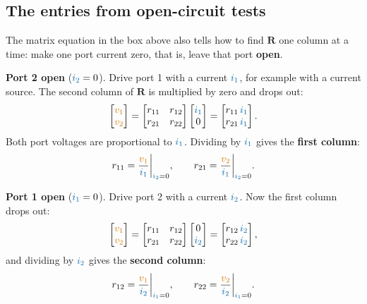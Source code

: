\documentclass[11pt,a4paper]{article}
\newcommand{\Icol}[1]{\textcolor{ccur}{#1}}
\newcommand{\Vcol}[1]{\textcolor{cvolt}{#1}}
\newcommand{\vone}{\Vcol{v_1}}  \newcommand{\vtwo}{\Vcol{v_2}}
\newcommand{\ione}{\Icol{i_1}}  \newcommand{\itwo}{\Icol{i_2}}
\newcommand{\Rm}{\mathbf{R}}  \newcommand{\Gm}{\mathbf{G}}
\begin{document}
\subsection{The entries from open-circuit tests}

The matrix equation in the box above also tells how to find $\Rm$ one column
at a time: make one port current zero, that is, leave that port \textbf{open}.

\textbf{Port 2 open} ($\itwo = 0$). Drive port 1 with a current $\ione$, for example with a
current source. The second column of $\Rm$ is multiplied by zero and drops out:
\[
  \begin{bmatrix} \vone\\ \vtwo \end{bmatrix}
  = \begin{bmatrix} r_{11} & r_{12}\\ r_{21} & r_{22} \end{bmatrix}
    \begin{bmatrix} \ione\\ 0 \end{bmatrix}
  = \begin{bmatrix} r_{11}\,\ione\\ r_{21}\,\ione \end{bmatrix} .
\]
Both port voltages are proportional to $\ione$. Dividing by $\ione$ gives the
\textbf{first column}:
\[
  r_{11} = \frac{\vone}{\ione}\bigg|_{\itwo = 0}, \qquad
  r_{21} = \frac{\vtwo}{\ione}\bigg|_{\itwo = 0} .
\]

\textbf{Port 1 open} ($\ione = 0$). Drive port 2 with a current $\itwo$. Now the first column
drops out:
\[
  \begin{bmatrix} \vone\\ \vtwo \end{bmatrix}
  = \begin{bmatrix} r_{11} & r_{12}\\ r_{21} & r_{22} \end{bmatrix}
    \begin{bmatrix} 0\\ \itwo \end{bmatrix}
  = \begin{bmatrix} r_{12}\,\itwo\\ r_{22}\,\itwo \end{bmatrix} ,
\]
and dividing by $\itwo$ gives the \textbf{second column}:
\[
  r_{12} = \frac{\vone}{\itwo}\bigg|_{\ione = 0}, \qquad
  r_{22} = \frac{\vtwo}{\itwo}\bigg|_{\ione = 0} .
\]
\end{document}
